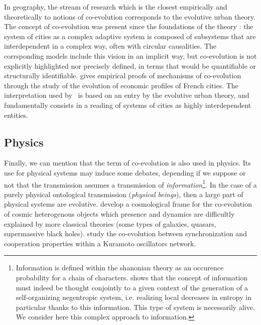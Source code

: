 \documentclass[letterpaper]{article}
\begin{document}
In geography, the stream of research which is the closest empirically and theoretically to notions of co-evolution corresponds to the evolutive urban theory. The concept of co-evolution was present since the foundations of the theory \citep{pumain1997pour}: the system of cities as a complex adaptive system is composed of subsystems that are interdependent in a complex way, often with circular causalities. The corrsponding models include this vision in an implicit way, but co-evolution is not explicitly highlighted nor precisely defined, in terms that would be quantifiable or structurally identifiable. \cite{paulus2004coevolution} gives empirical proofs of mechanisms of co-evolution through the study of the evolution of economic profiles of French cities. The interpretation used by~\cite{schmitt2014modelisation} is based on an entry by the evolutive urban theory, and fundamentally consists in a reading of systems of cities as highly interdependent entities.



\subsection{Physics}

Finally, we can mention that the term of co-evolution is also used in physics. Its use for physical systems may induce some debates, depending if we suppose or not that the transmission assumes a transmission of \emph{information}\footnote{Information is defined within the shanonian theory as an occurence probability for a chain of characters. \cite{morin1976methode} shows that the concept of information must indeed be thought conjointly to a given context of the generation of a self-organizing negentropic system, i.e. realizing local decreases in entropy in particular thanks to this information. This type of system is necessarily alive. We consider here this complex approach to information.}. In the case of a purely physical ontological transmission (\emph{physical beings}), then a large part of physical systems are evolutive. \cite{hopkins2008cosmological} develop a cosmological frame for the co-evolution of cosmic heterogenous objects which presence and dynamics are difficultly explained by more classical theories (some types of galaxies, quasars, supermassive black holes). \cite{antonioni2017coevolution} study the co-evolution between synchronization and cooperation properties within a Kuramoto oscillators network.
\end{document}
